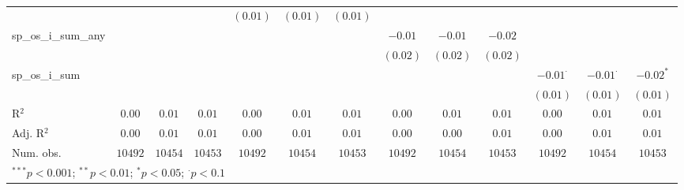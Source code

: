 \begin{sidewaystable}
\begin{center}
{\begin{tabular}{l c c c c c c c c c c c c}
                    &               &                 &                 & $(0.01)$      & $(0.01)$        & $(0.01)$        &                 &                 &                 &                 &                 &                 \\
sp\_os\_i\_sum\_any &               &                 &                 &               &                 &                 & $-0.01$         & $-0.01$         & $-0.02$         &                 &                 &                 \\
                    &               &                 &                 &               &                 &                 & $(0.02)$        & $(0.02)$        & $(0.02)$        &                 &                 &                 \\
sp\_os\_i\_sum      &               &                 &                 &               &                 &                 &                 &                 &                 & $-0.01^{\cdot}$ & $-0.01^{\cdot}$ & $-0.02^{*}$     \\
                    &               &                 &                 &               &                 &                 &                 &                 &                 & $(0.01)$        & $(0.01)$        & $(0.01)$        \\
\hline
R$^2$               & $0.00$        & $0.01$          & $0.01$          & $0.00$        & $0.01$          & $0.01$          & $0.00$          & $0.01$          & $0.01$          & $0.00$          & $0.01$          & $0.01$          \\
Adj. R$^2$          & $0.00$        & $0.01$          & $0.01$          & $0.00$        & $0.01$          & $0.01$          & $0.00$          & $0.00$          & $0.01$          & $0.00$          & $0.01$          & $0.01$          \\
Num. obs.           & $10492$       & $10454$         & $10453$         & $10492$       & $10454$         & $10453$         & $10492$         & $10454$         & $10453$         & $10492$         & $10454$         & $10453$         \\
\hline
\multicolumn{13}{l}{\scriptsize{$^{***}p<0.001$; $^{**}p<0.01$; $^{*}p<0.05$; $^{\cdot}p<0.1$}}
\end{tabular}
}
\caption{}
\label{table:coefficients}
\end{center}
\end{sidewaystable}
